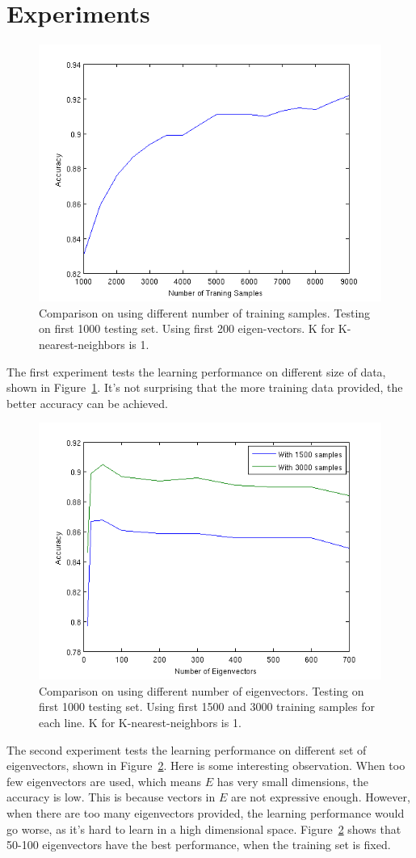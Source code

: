 \documentclass[10pt]{article}
\begin{document}
\section{Experiments}

\begin{figure}
\centering
\includegraphics[width=0.5\columnwidth]{diffDataSet.png}
\caption{Comparison on using different number of training samples.
Testing on first 1000 testing set. Using first 200 eigen-vectors. K
for K-nearest-neighbors is 1.}
\label{fig:dataset}
\end{figure}

The first experiment tests the learning performance on different size
of data, shown in Figure~\ref{fig:dataset}. It's not surprising that
the more training data provided, the better accuracy can be achieved.

\begin{figure}
\centering
\includegraphics[width=0.5\columnwidth]{diffEVector.png}
\caption{Comparison on using different number of eigenvectors.
Testing on first 1000 testing set. Using first 1500 and 3000 training
samples for each line.  K for K-nearest-neighbors is 1.}
\label{fig:evec}
\end{figure}

The second experiment tests the learning performance on different set
of eigenvectors, shown in Figure~\ref{fig:evec}. Here is some
interesting observation. When too few eigenvectors are used, which
means $E$ has very small dimensions, the accuracy is low. This is
because vectors in $E$ are not expressive enough. However, when there
are too many eigenvectors provided, the learning performance would go
worse, as it's hard to learn in a high dimensional space.
Figure~\ref{fig:evec} shows that 50-100 eigenvectors have the best
performance, when the training set is fixed.
\end{document}
